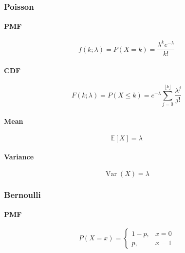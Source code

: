 \documentclass{article}
\begin{document}
\subsubsection{Poisson}
\label{subsubsec:prob-stat:dist:poiss}

\paragraph{PMF}
\label{para:prob-stat:dist:poiss:pmf}
\begin{equation}
    \label{eq:poiss-pmf}
    f(k; \lambda) = P(X=k) = \frac{\lambda^k e^{-\lambda}}{k!}
\end{equation}

\paragraph{CDF}
\label{para:prob-stat:dist:poiss:cdf}
\begin{equation}
    \label{eq:poiss-cdf}
    F(k; \lambda) = P(X \leq k) = e^{-\lambda} \sum_{j=0}^{\lfloor k \rfloor} \frac{\lambda^j}{j!}
\end{equation}

\paragraph{Mean}
\label{para:prob-stat:dist:poiss:mean}
\begin{equation}
    \label{eq:poiss-mean}
    \mathbb{E}[X] = \lambda
\end{equation}

\paragraph{Variance}
\label{para:prob-stat:dist:poiss:variance}
\begin{equation}
    \label{eq:poiss-variance}
    \operatorname{Var}(X) = \lambda
\end{equation}

\subsubsection{Bernoulli}
\label{subsubsec:prob-stat:dist:bern}

\paragraph{PMF}
\label{para:prob-stat:dist:bern:pmf}
\begin{equation}
    \label{eq:bern-pmf}
    P(X = x) =
    \begin{cases}
        1 - p, & x = 0 \\
        p, & x = 1
    \end{cases}
\end{equation}
\end{document}
